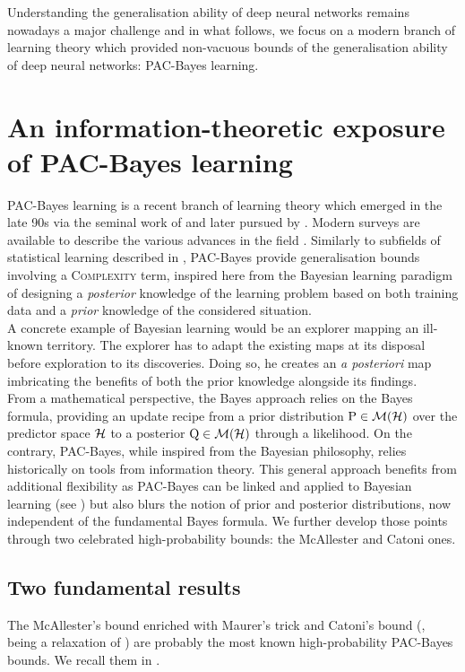 Understanding the generalisation ability of deep neural networks remains nowadays a major challenge and in what follows, we focus on a modern branch of learning theory which provided non-vacuous bounds of the generalisation ability of deep neural networks: PAC-Bayes learning.

\section{An information-theoretic exposure of PAC-Bayes learning}

PAC-Bayes learning is a recent branch of learning theory which emerged in the late 90s via the seminal work of \citep{shawe1997pac,mcallester1998some,mcallester1999pac,mcallester2003pac} and later pursued by \citep{catoni2003pac,catoni2007pac}. Modern surveys are available to describe the various advances in the field \citep{guedj2019primer,hellstrom2023generalization,alquier2024user}.  Similarly to subfields of statistical learning described in , PAC-Bayes provide generalisation bounds involving a \textsc{Complexity} term, inspired here from the Bayesian learning paradigm of designing a \emph{posterior} knowledge of the learning problem based on both training data and a \emph{prior} knowledge of the considered situation.\\
 A concrete example of Bayesian learning would be an explorer mapping an ill-known territory. The explorer has to adapt the existing maps at its disposal before exploration to its discoveries. Doing so, he creates an \emph{a posteriori} map imbricating the benefits of both the prior knowledge alongside its findings.\\
From a mathematical perspective, the Bayes approach relies on the Bayes formula, providing an update recipe from a prior distribution $\mathrm{P}\in\mathcal{M}(\mathcal{H})$ over the predictor space $\mathcal{H}$ to a posterior $\mathrm{Q}\in\mathcal{M}(\mathcal{H})$ through a likelihood. On the contrary, PAC-Bayes, while inspired from the Bayesian philosophy, relies historically on tools from information theory. This general approach benefits from additional flexibility as PAC-Bayes can be linked and applied to Bayesian learning (see \citealp{guedj2019primer}) but also blurs the notion of prior and posterior distributions, now independent of the fundamental Bayes formula. We further develop those points through two celebrated  high-probability bounds: the McAllester and Catoni ones. 

\subsection*{Two fundamental results}
    The McAllester's bound \citep{mcallester2003pac} enriched with Maurer's trick \citep{maurer2004note} and Catoni's bound (\citealp[Theorem 4.1]{alquier2016properties}, being a relaxation of \citealp[Theorem 1.2.6]{catoni2007pac}) are probably the most known high-probability PAC-Bayes bounds. We recall them in .

